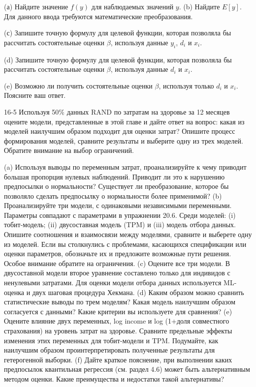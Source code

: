 (а) Найдите значение $f(y)$ для наблюдаемых значений $y$.
(b) Найдите $E[y]$. Для данного ввода требуются математические преобразования.


(с) Запишите точную формулу для целевой функции, которая позволяла бы рассчитать состоятельные оценки $\beta$, используя данные $y_i$, $d_i$ и $x_i$.

(d) Запишите точную формулу для целевой функции, которая позволяла бы рассчитать состоятельные оценки $\beta$, используя данные $d_i$ и $x_i$.

(e) Возможно ли получить состоятельные оценки $\beta$, используя только $d_i$ и $x_i$. Поясните ваш ответ.

16-5 
Используя 50\% данных RAND по затратам на здоровье за 12 месяцев оцените модели, представленные в этой главе и дайте ответ на вопрос: какая из моделей наилучшим образом подходит для оценки затрат? Опишите процесс формирования моделей, сравните результаты и выберите одну из трех моделей.
Обратите внимание на выбор ограничений.

(a)	Используя выводы по переменным затрат, проанализируйте к чему приводит большая пропорция нулевых наблюдений. Приводит ли это к нарушению предпосылки о нормальности? Существует ли преобразование, которое бы позволяло сделать предпосылку о нормальности более применимой?
(b)	Проанализируйте три модели, с одинаковыми независимыми переменными. Параметры совпадают с параметрами в упражнении 20.6. Среди моделей: (i) тобит-модель; (ii) двусоставная модель (TPM) и (iii) модель отбора данных. Опишите соотношения и взаимосвязи между моделями, сравните и выберете одну из моделей. Если вы столкнулись с проблемами, касающихся спецификации или оценки параметров, обозначьте их и предложите возможные пути решения. Особое внимание обратите на ограничения.
(c)	Оцените все три модели. В двусоставной модели второе уравнение составлено только для индивидов с ненулевыми затратами. Для оценки модели отбора данных используется ML-оценка и двух шаговая процедура Хекмана. 
(d)	Каким образом можно сравнить статистические выводы по трем моделям? Какая модель наилучшим образом согласуется с данными? Какие критерии вы используете для сравнения?
(e)	Оцените влияние двух переменных, log income и log (1+доля совместного страхования) на уровень затрат на здоровье. Сравните предельные эффекты изменения этих переменных для тобит-модели и TPM. Подумайте, как наилучшим образом проинтерпретировать полученные результаты для гетерогенной выборки.
(f)	Дайте краткое пояснение, при выполнении каких предпосылок квантильная регрессия (см. раздел 4.6) может быть альтернативным методом оценки. Какие преимущества и недостатки такой альтернативы?


